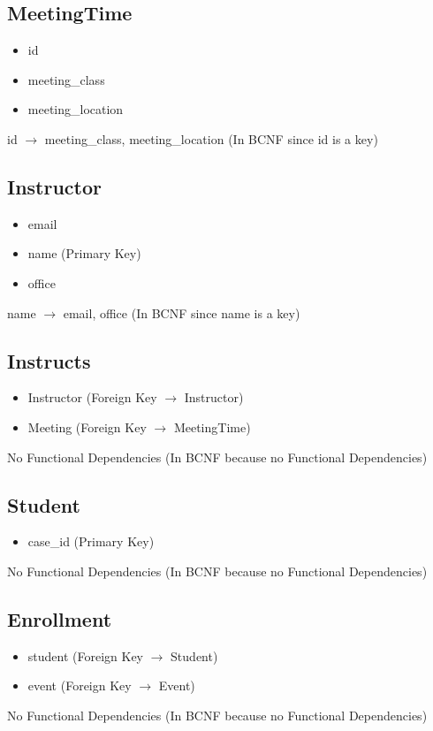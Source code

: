 \documentclass[pdftex,12pt,letter]{article}
\begin{document}
\subsection*{MeetingTime}
\begin{itemize}
\item id
\item meeting\_class
\item meeting\_location
\end{itemize}
id $\rightarrow$ meeting\_class, meeting\_location (In BCNF since id is a key)
\subsection*{Instructor}
\begin{itemize}
\item email
\item name (Primary Key)
\item office
\end{itemize}
name $\rightarrow$ email, office (In BCNF since name is a key)
\subsection*{Instructs}
\begin{itemize}
\item Instructor (Foreign Key $\rightarrow$ Instructor)
\item Meeting (Foreign Key $\rightarrow$ MeetingTime)
\end{itemize}
No Functional Dependencies (In BCNF because no Functional Dependencies)
\subsection*{Student}
\begin{itemize}
\item case\_id (Primary Key)
\end{itemize}
No Functional Dependencies (In BCNF because no Functional Dependencies)
\subsection*{Enrollment}
\begin{itemize}
\item student (Foreign Key $\rightarrow$ Student)
\item event (Foreign Key $\rightarrow$ Event)
\end{itemize}
No Functional Dependencies (In BCNF because no Functional Dependencies)
\end{document}
